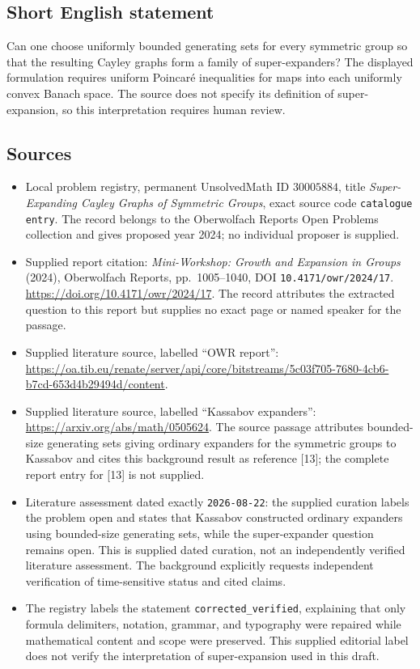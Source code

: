\documentclass[11pt]{article}
\begin{document}
\subsection{Short English statement}
Can one choose uniformly bounded generating sets for every symmetric group so that the resulting Cayley graphs form a family of super-expanders? The displayed formulation requires uniform Poincar\'e inequalities for maps into each uniformly convex Banach space. The source does not specify its definition of super-expansion, so this interpretation requires human review.
\subsection{Sources}
\begin{itemize}
\item Local problem registry, permanent UnsolvedMath ID \(30005884\), title \emph{Super-Expanding Cayley Graphs of Symmetric Groups}, exact source code \texttt{catalogue entry}. The record belongs to the Oberwolfach Reports Open Problems collection and gives proposed year 2024; no individual proposer is supplied.
\item Supplied report citation: \emph{Mini-Workshop: Growth and Expansion in Groups} (2024), Oberwolfach Reports, pp.\ 1005--1040, DOI \texttt{10.4171/owr/2024/17}. \url{https://doi.org/10.4171/owr/2024/17}. The record attributes the extracted question to this report but supplies no exact page or named speaker for the passage.
\item Supplied literature source, labelled ``OWR report'': \url{https://oa.tib.eu/renate/server/api/core/bitstreams/5c03f705-7680-4cb6-b7cd-653d4b29494d/content}.
\item Supplied literature source, labelled ``Kassabov expanders'': \url{https://arxiv.org/abs/math/0505624}. The source passage attributes bounded-size generating sets giving ordinary expanders for the symmetric groups to Kassabov and cites this background result as reference [13]; the complete report entry for [13] is not supplied.
\item Literature assessment dated exactly \texttt{2026-08-22}: the supplied curation labels the problem open and states that Kassabov constructed ordinary expanders using bounded-size generating sets, while the super-expander question remains open. This is supplied dated curation, not an independently verified literature assessment. The background explicitly requests independent verification of time-sensitive status and cited claims.
\item The registry labels the statement \texttt{corrected\_verified}, explaining that only formula delimiters, notation, grammar, and typography were repaired while mathematical content and scope were preserved. This supplied editorial label does not verify the interpretation of super-expansion used in this draft.
\end{itemize}
\end{document}
